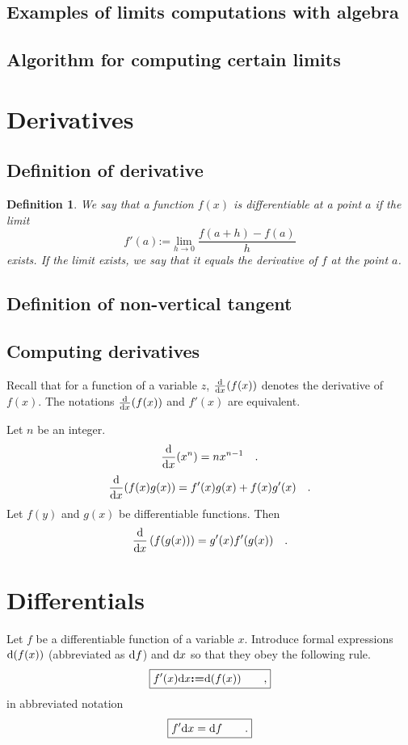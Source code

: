 \documentclass[12pt]{book}
\newcommand{\eqdef}{\textbf{:=}}
\newtheorem{definition}[theorem]{Definition}
\begin{document}
\subsection{Examples of limits computations with algebra}



\subsection{Algorithm for computing certain limits}


\section{Derivatives}

\subsection{Definition of derivative}\label{secDerivative}
\begin{definition}
We say that a function $f(x)$ is differentiable at a point $a$ if the limit
\begin{equation}\label{eqDefDerivative}
f'(a)\eqdef \lim_{h\to 0} \frac{f(a+h)-f(a)}{h}
\end{equation}
exists. If the limit exists, we say that it equals the derivative of $f$ at the point $a$.
\end{definition}

\subsection{Definition of non-vertical tangent}
\label{secDefTangent}

\subsection{Computing derivatives}
Recall that for a function of a variable $z$, $\frac{{\normalfont \text{d}} }{{\normalfont \text{d}} x}(f(x))$ denotes the derivative of $f(x)$. The notations $\frac{{\normalfont \text{d}} }{{\normalfont \text{d}} x}(f(x))$ and $f'(x)$ are equivalent.

Let $n$ be an integer.
\[
\frac{{\normalfont \text{d}} }{{\normalfont \text{d}} x} (x^n)= n x^{n-1}\quad .
\]
\[
\frac{{\normalfont \text{d}} }{{\normalfont \text{d}} x} (f(x)g(x)) = f'(x)g(x)+f(x)g'(x) \quad .
\]
Let $f(y)$ and $g(x)$ be differentiable functions.  Then
\[
\frac{{\normalfont \text{d}} }{{\normalfont \text{d}} x} \left(f( g(x))\right)= g'(x) f'(g(x)) \quad .
\]

\section{Differentials}
Let $f$ be a differentiable function of a variable $x$. Introduce formal expressions ${\normalfont \text{d}}(f(x))$ (abbreviated as ${\normalfont \text{d}} f$) and ${\normalfont \text{d}} x$ so that they obey the following rule.
\begin{equation}\boxed{
f'(x)\diff x\eqdef \diff(f(x))\quad \quad,
}
\end{equation}
in abbreviated notation
\begin{equation}\boxed{
f'{\normalfont \text{d}} x = {\normalfont \text{d}} f\quad \quad .
}
\end{equation}
\end{document}
